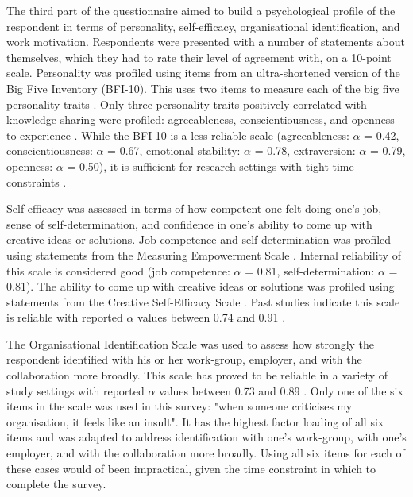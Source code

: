 The third part of the questionnaire aimed to build a psychological profile of the respondent in terms of personality, self-efficacy, organisational identification, and work motivation. Respondents were presented with a number of statements about themselves, which they had to rate their level of agreement with, on a 10-point scale. Personality was profiled using items from an ultra-shortened version of the Big Five Inventory (BFI-10). This uses two items to measure each of the big five personality traits \citep{rammstedt2007measuring}. Only three personality traits positively correlated with knowledge sharing were profiled: agreeableness, conscientiousness, and openness to experience \citep{matzler2008personality,matzler2011personality}. While the BFI-10 is a less reliable scale (agreeableness: $\alpha$ = 0.42, conscientiousness: $\alpha$ = 0.67, emotional stability: $\alpha$ = 0.78, extraversion: $\alpha$ = 0.79, openness: $\alpha$ = 0.50), it is sufficient for research settings with tight time-constraints \citep{rammstedt2007measuring}.\medskip

Self-efficacy was assessed in terms of how competent one felt doing one's job, sense of self-determination, and confidence in one's ability to come up with creative ideas or solutions. Job competence and self-determination was profiled using statements from the Measuring Empowerment Scale \citep{spreitzer1995psychological}. Internal reliability of this scale is considered good (job competence: $\alpha$ = 0.81, self-determination: $\alpha$ = 0.81). The ability to come up with creative ideas or solutions was profiled using statements from the Creative Self-Efficacy Scale \citep{tierney2002creative}. Past studies indicate this scale is reliable with reported $\alpha$ values between 0.74 and 0.91 \citep{tierney2002creative,gong2009employee,tierney2011creative,mittal2015transformational}.\medskip

The Organisational Identification Scale \citep{mael1992alumni} was used to assess how strongly the respondent identified with his or her work-group, employer, and with the collaboration more broadly. This scale has proved to be reliable in a variety of study settings with reported $\alpha$ values between 0.73 and 0.89 \citep{mael1992alumni,bergami2000self,knippenberg2000foci,van2008interactive}. Only one of the six items in the scale was used in this survey: "when someone criticises my organisation, it feels like an insult". It has the highest factor loading of all six items \citep{mael1992identifying} and was adapted to address identification with one's work-group, with one's employer, and with the collaboration more broadly. Using all six items for each of these cases would of been impractical, given the time constraint in which to complete the survey.\medskip


